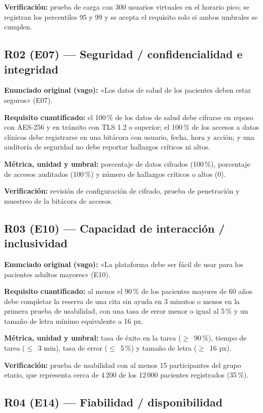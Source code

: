 \documentclass[11pt,a4paper]{article}
\begin{document}
\textbf{Verificación:} prueba de carga con 300 usuarios virtuales en el horario pico; se registran los percentiles 95 y 99 y se acepta el requisito solo si ambos umbrales se cumplen.

\subsection{R02 (E07) --- Seguridad / confidencialidad e integridad}

\textbf{Enunciado original (vago):} «Los datos de salud de los pacientes deben estar seguros» (E07).

\textbf{Requisito cuantificado:} el 100\,\% de los datos de salud debe cifrarse en reposo con AES-256 y en tránsito con TLS 1.2 o superior; el 100\,\% de los accesos a datos clínicos debe registrarse en una bitácora con usuario, fecha, hora y acción; y una auditoría de seguridad no debe reportar hallazgos críticos ni altos.

\textbf{Métrica, unidad y umbral:} porcentaje de datos cifrados (100\,\%), porcentaje de accesos auditados (100\,\%) y número de hallazgos críticos o altos (0).

\textbf{Verificación:} revisión de configuración de cifrado, prueba de penetración y muestreo de la bitácora de accesos.

\subsection{R03 (E10) --- Capacidad de interacción / inclusividad}

\textbf{Enunciado original (vago):} «La plataforma debe ser fácil de usar para los pacientes adultos mayores» (E10).

\textbf{Requisito cuantificado:} al menos el 90\,\% de los pacientes mayores de 60 años debe completar la reserva de una cita sin ayuda en 3 minutos o menos en la primera prueba de usabilidad, con una tasa de error menor o igual al 5\,\% y un tamaño de letra mínimo equivalente a 16 px.

\textbf{Métrica, unidad y umbral:} tasa de éxito en la tarea ($\geq$~90\,\%), tiempo de tarea ($\leq$~3 min), tasa de error ($\leq$~5\,\%) y tamaño de letra ($\geq$~16 px).

\textbf{Verificación:} prueba de usabilidad con al menos 15 participantes del grupo etario, que representa cerca de 4\,200 de los 12\,000 pacientes registrados (35\,\%).

\subsection{R04 (E14) --- Fiabilidad / disponibilidad}
\end{document}
